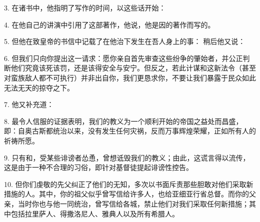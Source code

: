 3. 在诸书中，他指明了写作的时间，以这些话开始：\par

4. 在他自己的讲演中引用了这部著作，他说，他是因的著作而写的。\par

5. 但他在致皇帝的书信中记载了在他治下发生在吾人身上的事： 稍后他又说：\par

6. 但我们只向你提出这一请求：愿你亲自首先审查这些纷争的肇始者，并公正判断他们究竟该死该罚，还是该得安全与安宁。但反之，若此计谋和这新法令（甚至对蛮族敌人都不可执行）并非出自你，我们更恳求你，不要让我们暴露于民众如此无法无天的掠夺之下。\par

7. 他又补充道：\par

8. 最令人信服的证据表明，我们的教义为一个顺利开始的帝国之益处而昌盛，即：自奥古斯都统治以来，没有发生任何灾祸，反而万事辉煌荣耀，正如所有人的祈祷所愿。\par

9. 只有和，受某些诽谤者怂恿，曾想诋毁我们的教义；由此，这谎言得以流传，这是由于一种不合理的习俗，即针对基督徒提起诽谤性控告。\par

10. 但你们虔敬的先父纠正了他们的无知，多次以书面斥责那些胆敢对他们采取新措施的人。其中，你的祖父似乎曾写信给许多人，也给亚细亚行省总督。而你的父亲，当时你也与他一同统治，曾写信给各城，禁止他们对我们采取任何新措施；其中包括拉里萨人、得撒洛尼人、雅典人以及所有希腊人。\par

